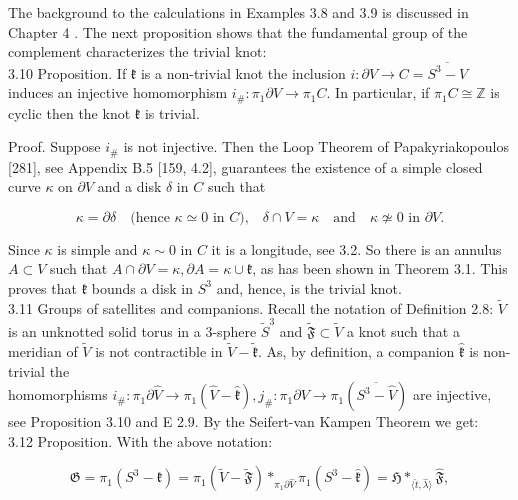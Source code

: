 \documentclass[10pt, letterpaper]{article}
\begin{document}
The background to the calculations in Examples 3.8 and 3.9 is discussed in Chapter 4 . The next proposition shows that the fundamental group of the complement characterizes the trivial knot:\\
3.10 Proposition. If $\mathfrak{k}$ is a non-trivial knot the inclusion $i: \partial V \rightarrow C=\overline{S^{3}-V}$ induces an injective homomorphism $i_{\#}: \pi_{1} \partial V \rightarrow \pi_{1} C$. In particular, if $\pi_{1} C \cong \mathbb{Z}$ is cyclic then the knot $\mathfrak{k}$ is trivial.

Proof. Suppose $i_{\#}$ is not injective. Then the Loop Theorem of Papakyriakopoulos [281], see Appendix B.5 [159, 4.2], guarantees the existence of a simple closed curve $\kappa$ on $\partial V$ and a disk $\delta$ in $C$ such that

$$
\kappa = \partial \delta 
\quad \text{(hence } \kappa \simeq 0 \text{ in } C\text{),} \quad 
\delta \cap V = \kappa \quad \text{and} \quad 
\kappa \not\simeq 0 \text{ in } \partial V\text{.}
$$

Since $\kappa$ is simple and $\kappa \sim 0$ in $C$ it is a longitude, see 3.2. So there is an annulus $A \subset V$ such that $A \cap \partial V=\kappa, \partial A=\kappa \cup \mathfrak{k}$, as has been shown in Theorem 3.1. This proves that $\mathfrak{k}$ bounds a disk in $S^{3}$ and, hence, is the trivial knot.\\
3.11 Groups of satellites and companions. Recall the notation of Definition 2.8: $\widetilde{V}$ is an unknotted solid torus in a 3-sphere $\widetilde{S}^{3}$ and $\widetilde{\mathfrak{F}} \subset \widetilde{V}$ a knot such that a meridian of $\widetilde{V}$ is not contractible in $\widetilde{V}-\widetilde{\mathfrak{k}}$. As, by definition, a companion $\widehat{\mathfrak{k}}$ is non-trivial the\\
homomorphisms $i_{\#}: \pi_{1} \partial \widehat{V} \rightarrow \pi_{1}(\widehat{V}-\widehat{\mathfrak{k}}), j_{\#}: \pi_{1} \partial V \rightarrow \pi_{1}\left(\overline{S^{3}-\widehat{V}}\right)$ are injective, see Proposition 3.10 and E 2.9. By the Seifert-van Kampen Theorem we get:\\
3.12 Proposition. With the above notation:

$$
\mathfrak{G}=\pi_{1}\left(S^{3}-\mathfrak{k}\right)=\pi_{1}(\widetilde{V}-\widetilde{\mathfrak{F}}) *_{\pi_{1} \partial \widehat{V}} \pi_{1}\left(S^{3}-\widehat{\mathfrak{k}}\right)=\mathfrak{H} *_{\langle\widehat{t}, \widehat{\lambda}\rangle} \widehat{\mathfrak{F}},
$$
\end{document}
